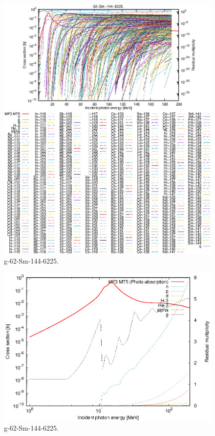 \begin{figure}
 \includegraphics[width=\linewidth]{eps/g_62-Sm-144_6225.eps}
  \caption{g-62-Sm-144-6225.}
\end{figure}
\newpage \clearpage

\begin{figure}
 \includegraphics[width=\linewidth]{eps-log/g_62-Sm-144_6225.eps}
 \caption{g-62-Sm-144-6225.}
\end{figure}
\newpage \clearpage

